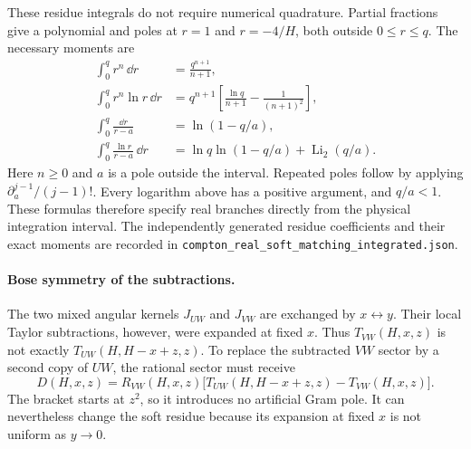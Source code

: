 These residue integrals do not require numerical quadrature.
Partial fractions give a polynomial and poles at $r=1$ and
$r=-4/H$, both outside $0\leq r\leq q$. The necessary moments are
\begin{align}
 \int_0^q r^n\,\dd r&=\frac{q^{n+1}}{n+1},\\
 \int_0^q r^n\ln r\,\dd r
 &=q^{n+1}\left[\frac{\ln q}{n+1}-\frac1{(n+1)^2}\right],\\
 \int_0^q\frac{\dd r}{r-a}&=\ln(1-q/a),\\
 \int_0^q\frac{\ln r}{r-a}\,\dd r
 &=\ln q\ln(1-q/a)+\operatorname{Li}_2(q/a).
\end{align}
Here $n\geq0$ and $a$ is a pole outside the interval.
Repeated poles follow by applying
$\partial_a^{j-1}/(j-1)!$. Every logarithm above has a positive
argument, and $q/a<1$. These formulas therefore specify real
branches directly from the physical integration interval.
The independently generated residue coefficients and their exact
moments are recorded in
\nolinkurl{compton_real_soft_matching_integrated.json}.


\paragraph{Bose symmetry of the subtractions.} The two mixed angular
kernels $J_{UW}$ and $J_{VW}$ are exchanged by $x\leftrightarrow y$.
Their local Taylor subtractions, however, were expanded at fixed
$x$. Thus $T_{VW}(H,x,z)$ is not exactly
$T_{UW}(H,H-x+z,z)$. To replace the subtracted $VW$ sector by a
second copy of $UW$, the rational sector must receive
\begin{equation}
 D(H,x,z)=R_{VW}(H,x,z)
 \big[T_{UW}(H,H-x+z,z)-T_{VW}(H,x,z)\big].
 \label{eq:comp-real-bose-restoration}
\end{equation}
The bracket starts at $z^2$, so it introduces no artificial Gram
pole. It can nevertheless change the soft residue because its
expansion at fixed $x$ is not uniform as $y\to0$.

